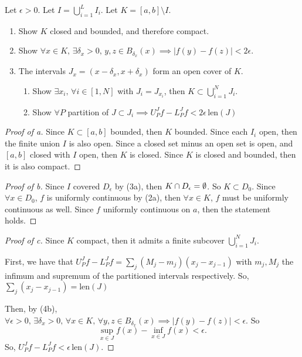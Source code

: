 \documentclass[../hw6]{subfiles}
\begin{document}
\begin{problem}[4]
Let $\epsilon>0$. Let $I=\bigcup_{i=1}^{L}I_i$. Let $K=[a,b]\setminus I$.
\begin{enumerate}[label=(\alph*)]
	\item Show $K$ closed and bounded, and therefore compact.
	\item Show $\forall x \in K,\, \exists \delta_x>0,\, y,z\in B_{\delta_x}(x)\implies |f(y)-f(z)|<2\epsilon$.
	\item The intervals $J_x = (x-\delta_x, x+\delta_x)$ form an open cover of $K$.
	      \begin{enumerate}[label=(\roman*)]
		      \item Show $\exists x_i,\, \forall i\in [1,N]$ with $J_i=J_{x_i}$, then $K\subset \bigcup_{i=1}^{N}J_i$.
		      \item Show $\forall P$ partition of $J\subset J_i \implies U_P^J f - L_P^J f < 2\epsilon\, \text{len}{(J)}$
	      \end{enumerate}
\end{enumerate}
\end{problem}
\begin{proof}[Proof of a]
	Since $K\subset [a,b]$ bounded, then  $K$ bounded.
	Since each $I_i$ open, then the finite union $I$ is also open.
	Since a closed set minus an open set is open, and $[a,b]$ closed with $I$ open, then $K$ is closed.
	Since $K$ is closed and bounded, then it is also compact.
\end{proof}
\begin{proof}[Proof of b]
	Since $I$ covered $D_\epsilon$ by (3a), then $K\cap D_\epsilon = \emptyset$.
	So $K\subset D_0$.
	Since $\forall x \in D_0$, $f$ is uniformly continuous by (2a), then $\forall x \in K$, $f$ must be uniformly continuous as well.
	Since $f$ uniformly continuous on  $a$, then the statement holds.
\end{proof}
\begin{proof}[Proof of c]
	Since $K$ compact, then it admits a finite subcover  $\bigcup_{i=1}^{N} J_i$.

	First, we have that $U_P^J f - L_P^J f = \sum_{j} (M_j-m_j)(x_j-x_{j-1})$ with $m_j,M_j$ the infimum and supremum of the partitioned intervals respectively.
	So, $\sum_{j} (x_j-x_{j-1}) = \text{len}{(J)} $

	Then, by (4b), $\forall \epsilon > 0,\, \exists \delta_x >0,\, \forall x \in K,\, \forall y,z\in B_{\delta_x}(x) \implies |f(y)-f(z)|<\epsilon$. So \[
		\sup_{x \in J}f(x) - \inf_{x \in J} f(x) < \epsilon.
	\]
	So, $U_P^J f - L_P^J f < \epsilon\, \text{len}{(J)}$.
\end{proof}
\end{document}
